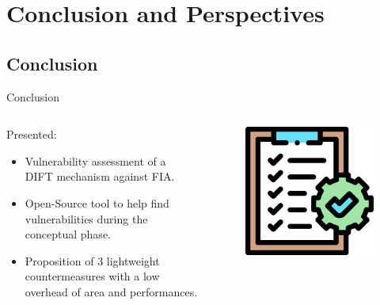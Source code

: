 \section{Conclusion and Perspectives}


\subsection{Conclusion}
\begin{frame}{Conclusion}
    \begin{columns}
        \begin{column}{.7\linewidth}
            \begin{block}{Presented:}
                \begin{itemize}
                    [triangle]
                    \item Vulnerability assessment of a DIFT mechanism against FIA.
                    \item Open-Source tool to help find vulnerabilities during the conceptual phase.
                    \item Proposition of 3 lightweight countermeasures with a low overhead of area and performances.
                \end{itemize}
            \end{block}
        \end{column}
        \begin{column}{.3\linewidth}
            \begin{figure}
                \centering
                \includegraphics[height=.25\textheight]{src/6_conclusion/img/conclusion.png}

\end{figure}
\end{column}
\end{columns}
\end{frame}
